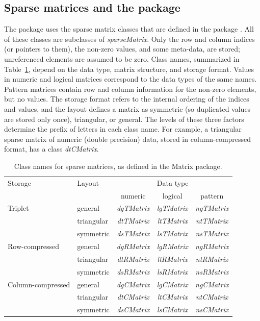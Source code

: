 \documentclass[article]{jss}\usepackage[]{graphicx}\usepackage[]{color}
\newcommand{\class}[1]{\textsl{#1}}
\begin{document}
\subsection[Sparse matrices in R]{Sparse matrices and the 
  package}\label{sec:Rsparse}

The  package uses the sparse matrix classes that are defined
in the  package \citep{R_Matrix}.  All of these classes are subclasses of
\class{sparseMatrix}. Only the row and column
indices (or pointers to them), the non-zero values, and some
meta-data, are stored; unreferenced elements are assumed to be
zero. Class names, summarized in Table~\ref{tab:MatrixClasses}, depend on the data type, matrix structure,
and storage format. Values in numeric and logical matrices correspond to the
 data types of the same names.  Pattern matrices contain
row and column information for the non-zero elements, but no
values. The storage format refers to the internal ordering of the
indices and values, and the layout defines a matrix as symmetric (so
duplicated values are stored only once), triangular, or general.  The
levels of these three factors determine the prefix of letters in each
class name. For example, a triangular sparse matrix of numeric (double
precision) data, stored in
column-compressed format, has a class \class{dtCMatrix}.

\begin{table}[tbh]\centering
  \begin{tabular}{ll|ccc}
      \toprule
   Storage&Layout&\multicolumn{3}{c}{Data type}\\
    &&numeric&logical&pattern\\
    \midrule
    Triplet&general&\class{dgTMatrix}&\class{lgTMatrix}&\class{ngTMatrix}\\
    &triangular&\class{dtTMatrix}&\class{ltTMatrix}&\class{ntTMatrix}\\
      &symmetric&\class{dsTMatrix}&\class{lsTMatrix}&\class{nsTMatrix}\\
    \midrule
        Row-compressed&general&\class{dgRMatrix}&\class{lgRMatrix}&\class{ngRMatrix}\\
    &triangular&\class{dtRMatrix}&\class{ltRMatrix}&\class{ntRMatrix}\\
      &symmetric&\class{dsRMatrix}&\class{lsRMatrix}&\class{nsRMatrix}\\
    \midrule
            Column-compressed&general&\class{dgCMatrix}&\class{lgCMatrix}&\class{ngCMatrix}\\
    &triangular&\class{dtCMatrix}&\class{ltCMatrix}&\class{ntCMatrix}\\
      &symmetric&\class{dsCMatrix}&\class{lsCMatrix}&\class{nsCMatrix}\\
\bottomrule
  \end{tabular}
    \caption{Class names for sparse matrices, as defined in the
    Matrix package.}\label{tab:MatrixClasses}
\end{table}
\end{document}
